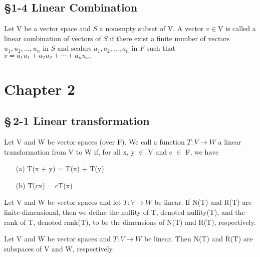 	\subsection*{\S 1-4 Linear Combination}
	\begin{defn}
	Let \(\mathrm{V}\) be a vector space and \(S\) a nonempty subset of \(\mathrm{V}\).
	A vector \(v \in \mathrm{V}\) is called a linear combination of vectors of \(S\) if there exist
a finite number of vectors \(u_{1}, u_{2}, \ldots, u_{n}\) in \(S\) and scalars \(a_{1}, a_{2}, \ldots, a_{n}\) in \(F\)
such that \(v=a_{1} u_{1}+a_{2} u_{2}+\cdots+a_{n} u_{n} .\) 
	\end{defn}
	
\newpage
\section*{Chapter 2}	
	\subsection*{\S\,2-1 Linear transformation}
\begin{defn}
$ $\\	Let V and W be vector spaces (over F). We call a function $T: V  \rightarrow  W$    a linear transformation from V to W if, for all x, y $\in$ V and c $\in$ F, we have

\begin{enumerate}
	\item [(a)]   T(x + y) = T(x) + T(y) 
	\item [(b)]    T(cx) = cT(x)
\end{enumerate} 
\end{defn}

\begin{defn}
$ $\\	Let V and W be vector spaces and let $T: V  \rightarrow  W$ be linear. If N(T) and R(T) are finite-dimensional, then we define the nullity of T, denoted nullity(T), and the rank of T, denoted rank(T), to be the dimensions of N(T) and R(T), respectively.
\end{defn}

\begin{thm*}
$ $ \\ 	Let V and W be vector spaces and $T: V  \rightarrow  W$ be linear. Then N(T) and R(T) are subspaces of V and W, respectively.
\end{thm*}

